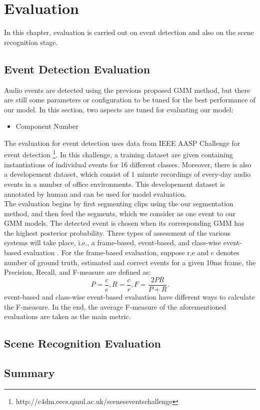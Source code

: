 \chapter{Evaluation}
In this chapter, evaluation is carried out on event detection and also on the scene recognition stage. 

\section{Event Detection Evaluation}
Audio events are detected using the previous proposed GMM method, but there are still some parameters or configuration to be tuned for the best performance of our model.
In this section, two aspects are tuned for evaluating our model: 
\begin{itemize}
\item{Component Number}
\end{itemize}

The evaluation for event detection uses data from IEEE AASP Challenge for event detection \footnote{http://c4dm.eecs.qmul.ac.uk/sceneseventschallenge}.  
In this challenge, a training dataset are given containing instantiations of individual events for 16 different classes. 
Moreover, there is also a developement dataset, which consist of 1 minute recordings of every-day audio events in a number of office environments. 
This developement dataset is annotated by human and can be used for model evaluation. \\ 

The evaluation begins by first segmenting clips using the our segmentation method, and then feed the segments, which we consider as one event to our GMM models. 
The detected event is chosen when its corresponding GMM has the highest posterior probability. 
Three types of assessment of the various systems will take place, i.e., a frame-based, event-based, and class-wise event-based evaluation \parencite{giannoulis2013database}.     
For the frame-based evaluation, suppose r,e and c denotes number of ground truth, estimated and correct events for a given 10ms frame, the Precision, Recall, and F-measure are defined as: 
\begin{equation}
	P = \frac{c}{e}, R = \frac{c}{r}, F = \frac{2PR}{P+R}.  
\end{equation}
event-based and class-wise event-based evaluation have different ways to calculate the F-measure. 
In the end, the average F-measure of the aforementioned evaluations are taken as the main metric.

\section{Scene Recognition Evaluation}

\section{Summary}
